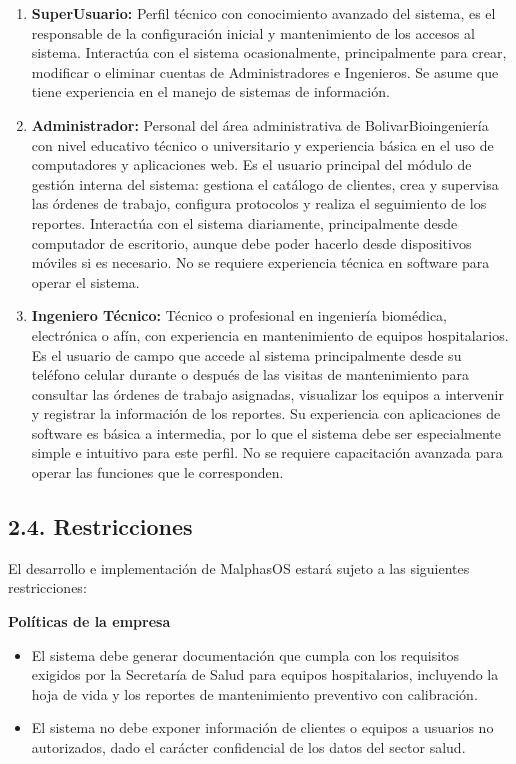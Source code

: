 \documentclass[12pt,a4paper]{article}
\newcommand{\subsectiontitle}[1]{%
  \subsection*{#1}
  \addcontentsline{toc}{subsection}{#1}
}
\begin{document}
\begin{enumerate}
  \item \textbf{SuperUsuario:}
  Perfil técnico con conocimiento avanzado del sistema, es el responsable de la configuración inicial y mantenimiento de los accesos al sistema. Interactúa con el sistema ocasionalmente, principalmente para crear, modificar o eliminar cuentas de Administradores e Ingenieros. Se asume que tiene experiencia en el manejo de sistemas de información.

  \item \textbf{Administrador:}
  Personal del área administrativa de BolivarBioingeniería con nivel educativo técnico o universitario y experiencia básica en el uso de computadores y aplicaciones web. Es el usuario principal del módulo de gestión interna del sistema: gestiona el catálogo de clientes, crea y supervisa las órdenes de trabajo, configura protocolos y realiza el seguimiento de los reportes. Interactúa con el sistema diariamente, principalmente desde computador de escritorio, aunque debe poder hacerlo desde dispositivos móviles si es necesario. No se requiere experiencia técnica en software para operar el sistema.

  \item \textbf{Ingeniero Técnico:}
  Técnico o profesional en ingeniería biomédica, electrónica o afín, con experiencia en mantenimiento de equipos hospitalarios. Es el usuario de campo que accede al sistema principalmente desde su teléfono celular durante o después de las visitas de mantenimiento para consultar las órdenes de trabajo asignadas, visualizar los equipos a intervenir y registrar la información de los reportes. Su experiencia con aplicaciones de software es básica a intermedia, por lo que el sistema debe ser especialmente simple e intuitivo para este perfil. No se requiere capacitación avanzada para operar las funciones que le corresponden.
\end{enumerate}

\subsectiontitle{2.4. Restricciones}

El desarrollo e implementación de MalphasOS estará sujeto a las siguientes restricciones:

\textbf{Políticas de la empresa}

\begin{itemize}
  \item El sistema debe generar documentación que cumpla con los requisitos exigidos por la Secretaría de Salud para equipos hospitalarios, incluyendo la hoja de vida y los reportes de mantenimiento preventivo con calibración.

  \item El sistema no debe exponer información de clientes o equipos a usuarios no autorizados, dado el carácter confidencial de los datos del sector salud.
\end{itemize}
\end{document}
